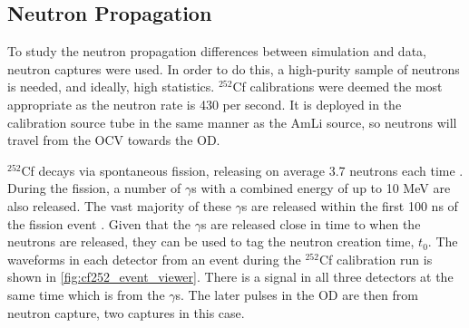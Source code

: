 \subsection{Neutron Propagation}
\par
To study the neutron propagation differences between simulation and data, neutron captures were used.
In order to do this, a high-purity sample of neutrons is needed, and ideally, high statistics.
${}^{252}$Cf calibrations were deemed the most appropriate as the neutron rate is 430 per second. 
It is deployed in the calibration source tube in the same manner as the AmLi source, so neutrons will travel from the OCV towards the OD.
\par
${}^{252}$Cf decays via spontaneous fission, releasing on average 3.7 neutrons each time \cite{californium252_ref}.
During the fission, a number of $\gamma$s with a combined energy of up to 10 MeV are also released.
The vast majority of these $\gamma$s are released within the first 100 ns of the fission event \cite{cf252_fission_ref,californium_spectra_ref}.
Given that the $\gamma$s are released close in time to when the neutrons are released, they can be used to tag the neutron creation time, $t_0$.
The waveforms in each detector from an event during the ${}^{252}$Cf calibration run is shown in \autoref{fig:cf252_event_viewer}.
There is a signal in all three detectors at the same time which is from the $\gamma$s.
The later pulses in the OD are then from neutron capture, two captures in this case.


